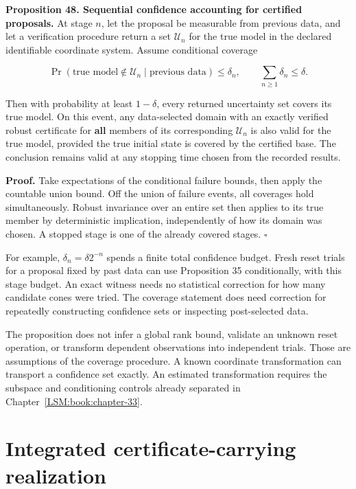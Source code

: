 \textbf{Proposition 48. Sequential confidence accounting for certified
proposals.} At stage \(n\), let the proposal be measurable from previous
data, and let a verification procedure return a set \(\mathcal U_n\) for
the true model in the declared identifiable coordinate system. Assume
conditional coverage

\[
\Pr(\text{true model}\notin\mathcal U_n\mid\text{previous data})
\leq\delta_n,
\qquad\sum_{n\geq1}\delta_n\leq\delta.
\]

Then with probability at least \(1-\delta\), every returned uncertainty
set covers its true model. On this event, any data-selected domain with
an exactly verified robust certificate for \textbf{all} members of its
corresponding \(\mathcal U_n\) is also valid for the true model,
provided the true initial state is covered by the certified base. The
conclusion remains valid at any stopping time chosen from the recorded
results.

\textbf{Proof.} Take expectations of the conditional failure bounds,
then apply the countable union bound. Off the union of failure events,
all coverages hold simultaneously. Robust invariance over an entire set
then applies to its true member by deterministic implication,
independently of how its domain was chosen. A stopped stage is one of
the already covered stages. \(\square\)

For example, \(\delta_n=\delta 2^{-n}\) spends a finite total confidence
budget. Fresh reset trials for a proposal fixed by past data can use
Proposition 35 conditionally, with this stage budget. An exact witness
needs no statistical correction for how many candidate cones were tried.
The coverage statement does need correction for repeatedly constructing
confidence sets or inspecting post-selected data.

The proposition does not infer a global rank bound, validate an unknown
reset operation, or transform dependent observations into independent
trials. Those are assumptions of the coverage procedure. A known
coordinate transformation can transport a confidence set exactly. An
estimated transformation requires the subspace and conditioning controls
already separated in Chapter~\ref{LSM:book:chapter-33}.

\section{Integrated certificate-carrying realization}\label{LSM:integrated-certificate-carrying-realization}

